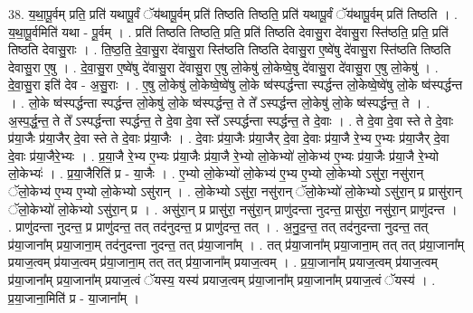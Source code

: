 \documentclass[17pt]{extarticle}
\begin{document}
38. य॒था॒पू॒र्वम् प्रति॒ प्रति॑ यथापू॒र्वं ॅय॑थापू॒र्वम् प्रति॑ तिष्ठति तिष्ठति॒ प्रति॑ यथापू॒र्वं ॅय॑थापू॒र्वम् प्रति॑ तिष्ठति । . य॒था॒पू॒र्वमिति॑ यथा - पू॒र्वम् । . प्रति॑ तिष्ठति तिष्ठति॒ प्रति॒ प्रति॑ तिष्ठति देवासु॒रा दे॑वासु॒रा स्ति॑ष्ठति॒ प्रति॒ प्रति॑ तिष्ठति देवासु॒राः । . ति॒ष्ठ॒ति॒ दे॒वा॒सु॒रा दे॑वासु॒रा स्ति॑ष्ठति तिष्ठति देवासु॒रा ए॒ष्वे॑षु दे॑वासु॒रा स्ति॑ष्ठति तिष्ठति देवासु॒रा ए॒षु । . दे॒वा॒सु॒रा ए॒ष्वे॑षु दे॑वासु॒रा दे॑वासु॒रा ए॒षु लो॒केषु॑ लो॒केष्वे॒षु दे॑वासु॒रा दे॑वासु॒रा ए॒षु लो॒केषु॑ । . दे॒वा॒सु॒रा इति॑ देव - अ॒सु॒राः । . ए॒षु लो॒केषु॑ लो॒केष्वे॒ष्वे॑षु लो॒के ष्व॑स्पर्द्धन्ता स्पर्द्धन्त लो॒केष्वे॒ष्वे॑षु लो॒के ष्व॑स्पर्द्धन्त । . लो॒के ष्व॑स्पर्द्धन्ता स्पर्द्धन्त लो॒केषु॑ लो॒के ष्व॑स्पर्द्धन्त॒ ते ते᳚ ऽस्पर्द्धन्त लो॒केषु॑ लो॒के ष्व॑स्पर्द्धन्त॒ ते । . अ॒स्प॒र्द्ध॒न्त॒ ते ते᳚ ऽस्पर्द्धन्ता स्पर्द्धन्त॒ ते दे॒वा दे॒वा स्ते᳚ ऽस्पर्द्धन्ता स्पर्द्धन्त॒ ते दे॒वाः । . ते दे॒वा दे॒वा स्ते ते दे॒वाः प्र॑या॒जैः प्र॑या॒जैर् दे॒वा स्ते ते दे॒वाः प्र॑या॒जैः । . दे॒वाः प्र॑या॒जैः प्र॑या॒जैर् दे॒वा दे॒वाः प्र॑या॒जै रे॒भ्य ए॒भ्यः प्र॑या॒जैर् दे॒वा दे॒वाः प्र॑या॒जैरे॒भ्यः । . प्र॒या॒जै रे॒भ्य ए॒भ्यः प्र॑या॒जैः प्र॑या॒जै रे॒भ्यो लो॒केभ्यो॑ लो॒केभ्य॑ ए॒भ्यः प्र॑या॒जैः प्र॑या॒जै रे॒भ्यो लो॒केभ्यः॑ । . प्र॒या॒जैरिति॑ प्र - या॒जैः । . ए॒भ्यो लो॒केभ्यो॑ लो॒केभ्य॑ ए॒भ्य ए॒भ्यो लो॒केभ्यो ऽसु॑रा॒ नसु॑रान् ॅलो॒केभ्य॑ ए॒भ्य ए॒भ्यो लो॒केभ्यो ऽसु॑रान् । . लो॒केभ्यो ऽसु॑रा॒ नसु॑रान् ॅलो॒केभ्यो॑ लो॒केभ्यो ऽसु॑रा॒न् प्र प्रासु॑रान् ॅलो॒केभ्यो॑ लो॒केभ्यो ऽसु॑रा॒न् प्र । . असु॑रा॒न् प्र प्रासु॑रा॒ नसु॑रा॒न् प्राणु॑दन्ता नुदन्त॒ प्रासु॑रा॒ नसु॑रा॒न् प्राणु॑दन्त । . प्राणु॑दन्ता नुदन्त॒ प्र प्राणु॑दन्त॒ तत् तद॑नुदन्त॒ प्र प्राणु॑दन्त॒ तत् । . अ॒नु॒द॒न्त॒ तत् तद॑नुदन्ता नुदन्त॒ तत् प्र॑या॒जाना᳚म् प्रया॒जाना॒म् तद॑नुदन्ता नुदन्त॒ तत् प्र॑या॒जाना᳚म् । . तत् प्र॑या॒जाना᳚म् प्रया॒जाना॒म् तत् तत् प्र॑या॒जाना᳚म् प्रयाज॒त्वम् प्र॑याज॒त्वम् प्र॑या॒जाना॒म् तत् तत् प्र॑या॒जाना᳚म् प्रयाज॒त्वम् । . प्र॒या॒जाना᳚म् प्रयाज॒त्वम् प्र॑याज॒त्वम् प्र॑या॒जाना᳚म् प्रया॒जाना᳚म् प्रयाज॒त्वं ॅयस्य॒ यस्य॑ प्रयाज॒त्वम् प्र॑या॒जाना᳚म् प्रया॒जाना᳚म् प्रयाज॒त्वं ॅयस्य॑ । . प्र॒या॒जाना॒मिति॑ प्र - या॒जाना᳚म् । \newline
\pagebreak
{}
\end{document}
